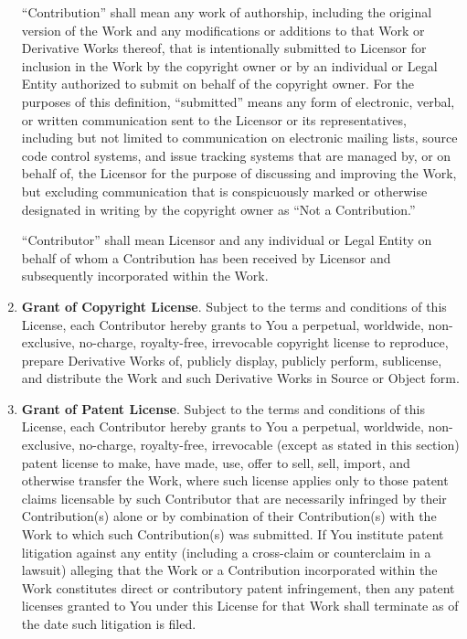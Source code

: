 \documentclass{pracamgr}
\begin{document}
\begin{enumerate}
  ``Contribution'' shall mean any work of authorship, including the
  original version of the Work and any modifications or additions to
  that Work or Derivative Works thereof, that is intentionally
  submitted to Licensor for inclusion in the Work by the copyright
  owner or by an individual or Legal Entity authorized to submit on
  behalf of the copyright owner. For the purposes of this definition,
  ``submitted'' means any form of electronic, verbal, or written
  communication sent to the Licensor or its representatives, including
  but not limited to communication on electronic mailing lists, source
  code control systems, and issue tracking systems that are managed
  by, or on behalf of, the Licensor for the purpose of discussing and
  improving the Work, but excluding communication that is
  conspicuously marked or otherwise designated in writing by the
  copyright owner as ``Not a Contribution.''

  ``Contributor'' shall mean Licensor and any individual or Legal Entity
  on behalf of whom a Contribution has been received by Licensor and
  subsequently incorporated within the Work.

\item \textbf{Grant of Copyright License}. Subject to the terms and
  conditions of this License, each Contributor hereby grants to You a
  perpetual, worldwide, non-exclusive, no-charge, royalty-free,
  irrevocable copyright license to reproduce, prepare Derivative Works
  of, publicly display, publicly perform, sublicense, and distribute
  the Work and such Derivative Works in Source or Object form.

\item \textbf{Grant of Patent License}. Subject to the terms and
  conditions of this License, each Contributor hereby grants to You a
  perpetual, worldwide, non-exclusive, no-charge, royalty-free,
  irrevocable (except as stated in this section) patent license to
  make, have made, use, offer to sell, sell, import, and otherwise
  transfer the Work, where such license applies only to those patent
  claims licensable by such Contributor that are necessarily infringed
  by their Contribution(s) alone or by combination of their
  Contribution(s) with the Work to which such Contribution(s) was
  submitted. If You institute patent litigation against any entity
  (including a cross-claim or counterclaim in a lawsuit) alleging that
  the Work or a Contribution incorporated within the Work constitutes
  direct or contributory patent infringement, then any patent licenses
  granted to You under this License for that Work shall terminate as
  of the date such litigation is filed.


\end{enumerate}
\end{document}
